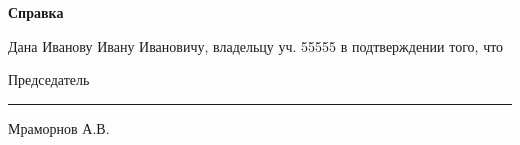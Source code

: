 \vspace{10mm}
\begin{center}
	\Large\textbf{ Справка}
\end{center}
\par

Дана Иванову Ивану Ивановичу, владельцу уч. 55555 в подтверждении того, что 

\vspace{35mm}
Председатель \hfill    \rule{4cm}{0.1 mm}    Мраморнов А.В.




